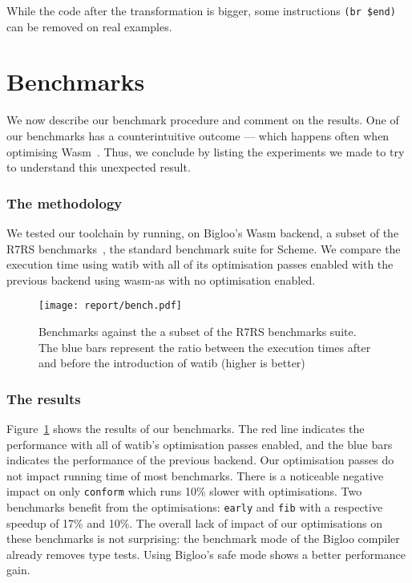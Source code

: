 \documentclass[a4paper,11pt]{article}
\begin{document}
While the code after the transformation is bigger, some instructions \texttt{(br
  \$end)} can be removed on real examples.

\section{Benchmarks}\label{bench}
We now describe our benchmark procedure and comment on the results. One of our
benchmarks has a counterintuitive outcome --- which happens often when
optimising Wasm~\cite{romano2023function}. Thus, we conclude by listing the
experiments we made to try to understand this unexpected result.
\subsubsection{The methodology}
We tested our toolchain by running, on Bigloo's Wasm backend, a subset of the
R7RS benchmarks~\cite{r7rsbench}, the standard benchmark suite for Scheme. We
compare the execution time using \textsf{watib} with all of its optimisation
passes enabled with the previous backend using \textsf{wasm-as} with no
optimisation enabled.
\begin{figure}[h!]
  \texttt{[image: report/bench.pdf]}
  \caption{Benchmarks against the a subset of the R7RS benchmarks suite. The
    blue bars represent the ratio between the execution times after and before
    the introduction of \textsf{watib} (higher is better)}\label{r7rs}
\end{figure}
\subsubsection{The results}
Figure~\ref{r7rs} shows the results of our benchmarks. The red line indicates
the performance with all of \textsf{watib}'s optimisation passes enabled,
and the blue bars indicates the performance of the previous backend. Our
optimisation passes do not impact running time of most benchmarks. There is a
noticeable negative impact on only \texttt{conform} which runs 10\% slower with
optimisations. Two benchmarks benefit from the optimisations: \texttt{early} and
\texttt{fib} with a respective speedup of 17\% and 10\%. The overall lack of
impact of our optimisations on these benchmarks is not surprising: the benchmark
mode of the Bigloo compiler already removes type tests. Using Bigloo's safe mode
shows a better performance gain.
\end{document}
